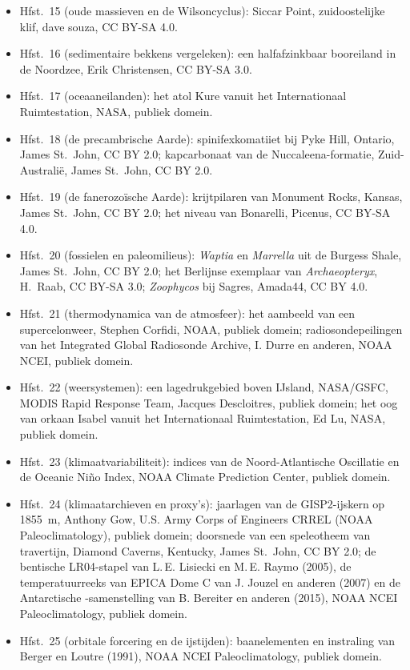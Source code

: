 \begin{itemize}
  \item Hfst.~15 (oude massieven en de Wilsoncyclus): Siccar Point, zuidoostelijke klif, dave souza, CC BY-SA 4.0.
  \item Hfst.~16 (sedimentaire bekkens vergeleken): een halfafzinkbaar booreiland in de Noordzee, Erik Christensen, CC BY-SA 3.0.
  \item Hfst.~17 (oceaaneilanden): het atol Kure vanuit het Internationaal Ruimtestation, NASA, publiek domein.
  \item Hfst.~18 (de precambrische Aarde): spinifexkomatiiet bij Pyke Hill, Ontario, James St.~John, CC BY 2.0; kapcarbonaat van de Nuccaleena-formatie, Zuid-Australië, James St.~John, CC BY 2.0.
  \item Hfst.~19 (de fanerozoïsche Aarde): krijtpilaren van Monument Rocks, Kansas, James St.~John, CC BY 2.0; het niveau van Bonarelli, Picenus, CC BY-SA 4.0.
  \item Hfst.~20 (fossielen en paleomilieus): \emph{Waptia} en \emph{Marrella} uit de Burgess Shale, James St.~John, CC BY 2.0; het Berlijnse exemplaar van \emph{Archaeopteryx}, H.~Raab, CC BY-SA 3.0; \emph{Zoophycos} bij Sagres, Amada44, CC BY 4.0.
  \item Hfst.~21 (thermodynamica van de atmosfeer): het aambeeld van een supercelonweer, Stephen Corfidi, NOAA, publiek domein; radiosondepeilingen van het Integrated Global Radiosonde Archive, I. Durre en anderen, NOAA NCEI, publiek domein.
  \item Hfst.~22 (weersystemen): een lagedrukgebied boven IJsland, NASA/GSFC, MODIS Rapid Response Team, Jacques Descloitres, publiek domein; het oog van orkaan Isabel vanuit het Internationaal Ruimtestation, Ed Lu, NASA, publiek domein.
  \item Hfst.~23 (klimaatvariabiliteit): indices van de Noord-Atlantische Oscillatie en de Oceanic Niño Index, NOAA Climate Prediction Center, publiek domein.
  \item Hfst.~24 (klimaatarchieven en proxy's): jaarlagen van de GISP2-ijskern op 1855~m, Anthony Gow, U.S. Army Corps of Engineers CRREL (NOAA Paleoclimatology), publiek domein; doorsnede van een speleotheem van travertijn, Diamond Caverns, Kentucky, James St.~John, CC BY 2.0; de bentische LR04-stapel van L.\,E. Lisiecki en M.\,E. Raymo (2005), de temperatuurreeks van EPICA Dome C van J. Jouzel en anderen (2007) en de Antarctische -samenstelling van B. Bereiter en anderen (2015), NOAA NCEI Paleoclimatology, publiek domein.
  \item Hfst.~25 (orbitale forcering en de ijstijden): baanelementen en instraling van Berger en Loutre (1991), NOAA NCEI Paleoclimatology, publiek domein.

\end{itemize}
